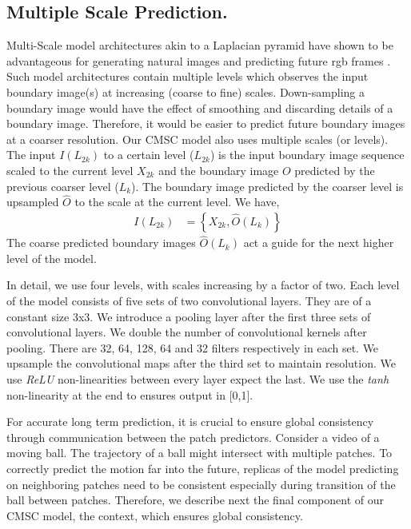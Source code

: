 \subsection{Multiple Scale Prediction.} 
Multi-Scale model architectures akin to a Laplacian pyramid have shown to be advantageous for generating natural images \cite{denton2015deep} and predicting future rgb frames \cite{mathieu2015deep}. Such model architectures contain multiple levels which observes the input boundary image(s) at increasing (coarse to fine) scales. Down-sampling a boundary image would have the effect of smoothing and discarding details of a boundary image. Therefore, it would be easier to predict future boundary images at a coarser resolution. Our CMSC model also uses multiple scales (or levels). The input $I(L_{2k})$ to a certain level ($L_{2k}$) is the input boundary image sequence scaled  to the current level $X_{2k}$ and the boundary image $O$ predicted by the previous coarser level ($L_{k}$). The boundary image predicted by the coarser level is upsampled $\hat{O}$ to the scale at the current level. We have,
\begin{align*}
    I(L_{2k}) &=  \left\{ X_{2k}, \hat{O}(L_{k}) \right\}
\end{align*} 
The coarse predicted boundary images $\hat{O}(L_{k})$ act a guide for the next higher level of the model. 

In detail, we use four levels, with scales increasing by a factor of two.  Each level of the model consists of five sets of two convolutional layers. They are of a constant size 3x3. We introduce a pooling layer after the first three sets of convolutional layers. We double the number of convolutional kernels after pooling. There are 32, 64, 128, 64 and 32 filters respectively in each set. We upsample the convolutional maps after the third set to maintain resolution. We use \emph{ReLU} non-linearities between every layer expect the last. We use the \emph{tanh} non-linearity at the end to ensures output in [0,1].

For accurate long term prediction, it is crucial to ensure global consistency through communication between the patch predictors. Consider a video of a moving ball. The trajectory of a ball might intersect with multiple patches. To correctly predict the motion far into the future, replicas of the model predicting on neighboring patches need to be consistent especially during transition of the ball between patches. Therefore, we describe next the final component of our CMSC model, the context, which ensures global consistency.

